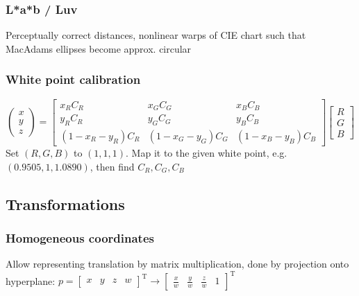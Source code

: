 \documentclass[a4paper,10pt]{article}
\begin{document}
\subsubsection{L*a*b / Luv} Perceptually correct distances, nonlinear warps of CIE chart such that MacAdams ellipses become approx. circular

\subsubsection{White point calibration}
\[\left(\begin{smallmatrix} x \\ y \\ z \end{smallmatrix}\right) = \left[\begin{smallmatrix} x_R C_R & x_G C_G & x_B C_B \\ y_R C_R & y_G C_G & y_B C_B \\ (1-x_R-y_R)C_R & (1-x_G-y_G)C_G & (1-x_B-y_B)C_B \end{smallmatrix}\right] \left[\begin{smallmatrix}R\\G\\B\end{smallmatrix}\right]\] 
Set \((R, G, B) \) to \( (1,1,1) \). Map it to the given white point, e.g. \( (0.9505, 1, 1.0890) \), then find \( C_R, C_G, C_B \)

\subsection{Transformations}
\subsubsection{Homogeneous coordinates}
Allow representing translation by matrix multiplication, done by projection onto hyperplane: \( p = \left[\begin{smallmatrix}x & y & z & w\end{smallmatrix}\right]^\mathrm{T} \to \left[\begin{smallmatrix}\frac{x}{w} & \frac{y}{w} & \frac{z}{w} & 1\end{smallmatrix}\right]^\mathrm{T} \)
\end{document}

